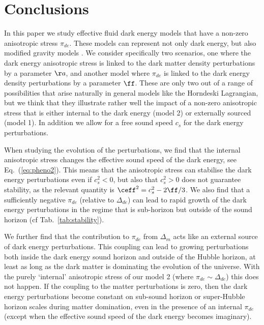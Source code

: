\section{Conclusions}
\label{chapter-ade:conclusions}

In this paper we study effective fluid dark energy models that have a non-zero anisotropic stress $\pi_{de}$. These models
can represent not only dark energy, but also modified gravity models \cite{Kunz:2006ca}. We consider specifically two
scenarios, one where the dark energy anisotropic stress is linked to the dark matter density perturbations by a parameter $\aa$, and
another model where $\pi_{de}$ is linked to the dark energy density perturbations by a parameter $\ff$. These are only two out
of a range of possibilities that arise naturally in general models like the Horndeski Lagrangian, but we think that
they illustrate rather well the impact of a non-zero anisotropic stress that is either internal to the dark energy (model 2)
or externally sourced (model 1). In addition we allow for a free sound speed $c_s$ for the dark energy perturbations.

When studying the evolution of the perturbations, we find that
the internal anisotropic stress changes the effective sound speed of the dark energy, see Eq.\ (\ref{eq:pheno2}).
This means that the anisotropic stress can stabilise the dark energy perturbations even if $c_s^2<0$, but also that
$c_s^2>0$ does not guarantee stability, as the relevant quantity is $\ceff^2=c_s^2 - 2\ff / 3$. We also find that a sufficiently negative
$\pi_{de}$ (relative to $\Delta_{de}$) can lead to rapid growth of the dark energy perturbations in the regime that is sub-horizon
but outside of the sound horizon (cf Tab.\ \ref{tab:stability}).

We further find that the contribution to $\pi_{de}$ from $\Delta_m$ acts like
an external source of dark energy perturbations. This coupling can lead to growing perturbations both inside the
dark energy sound horizon and outside of the Hubble horizon, at least as long as the dark matter is dominating the
evolution of the universe. With the purely `internal' anisotropic stress of our
model 2 (where $\pi_{de} \sim \Delta_{de}$) this does not happen. If the coupling to the matter perturbations is zero,
then the dark energy perturbations become constant on sub-sound horizon or super-Hubble horizon scales during
matter domination, even in the presence of an internal $\pi_{de}$ (except when the effective sound speed of the
dark energy becomes imaginary).

